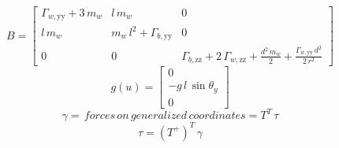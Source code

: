 \documentclass[a4paper, 7px]{article}
\begin{document}
$$B = 
\begin{bmatrix}
	\Gamma _{w,\mathrm{yy}}+3\,m_{w} & l\,m_{w} & 0\\
	l\,m_{w} & m_{w}\,l^2+\Gamma _{b,\mathrm{yy}} & 0\\
	0 & 0 & \Gamma _{b,\mathrm{zz}}+2\,\Gamma _{w,\mathrm{zz}}+\frac{d^2\,m_{w}}{2}+\frac{\Gamma _{w,\mathrm{yy}}\,d^2}{2\,r^2} \end{bmatrix}
$$
$$g(u) = 
\begin{bmatrix}
	0\\
	-g \, l \, \sin{\theta_y}\\
	0
\end{bmatrix}
$$
$$\gamma = \, forces \, on \, generalized \, coordinates = T^T \,  \tau$$
$$\tau = (T^+)^T \, \gamma$$
\end{document}
